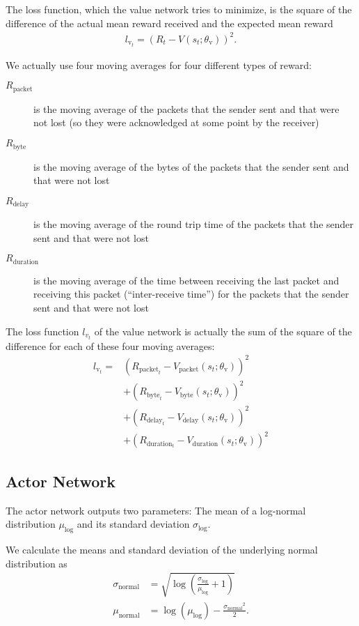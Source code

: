 \documentclass[sigconf]{acmart}
\begin{document}
The loss function, which the value network tries to minimize, is the square of the difference of the actual mean reward received and the expected mean reward
\begin{align*}
l_{\text{v}_t} = \left(R_t - V(s_t; \theta_\text{v})\right)^2.
\end{align*}

We actually use four moving averages for four different types of reward: 
\begin{description}
\item[$\textit{R}_\text{packet}$] is the moving average of the packets that the sender sent and that were not lost (so they were acknowledged at some point by the receiver)
\item[$\textit{R}_\text{byte}$] is the moving average of the bytes of the packets that the sender sent and that were not lost
\item[$\textit{R}_\text{delay}$] is the moving average of the round trip time of the packets that the sender sent and that were not lost
\item[$\textit{R}_\text{duration}$] is the moving average of the time between receiving the last packet and receiving this packet (``inter-receive time'') for the packets that the sender sent and that were not lost
\end{description}

The loss function $l_{v_t}$ of the value network is actually the sum of the square of the difference for each of these four moving averages:
\begin{align*}
l_{\text{v}_t} =& \left(R_{\text{packet}_t} - V_\text{packet}(s_t; \theta_\text{v})\right)^2 \\
&+\left(R_{\text{byte}_t} - V_\text{byte}(s_t; \theta_\text{v})\right)^2 \\
&+\left(R_{\text{delay}_t} - V_\text{delay}(s_t; \theta_\text{v})\right)^2 \\
&+\left(R_{\text{duration}_t} - V_\text{duration}(s_t; \theta_\text{v})\right)^2
\end{align*}

\subsection{Actor Network}
\label{subsec:actor}

The actor network outputs two parameters: The mean of a log-normal distribution $\mu_\text{log}$ and its standard deviation $\sigma_\text{log}$. 

We calculate the means and standard deviation of the underlying normal distribution as
\begin{align*}
\sigma_\text{normal} &= \sqrt{\log \left( \frac{\sigma_\text{log}}{\mu_\text{log}} +1 \right)} \\
\mu_\text{normal} &= \log\left(\mu_\text{log}\right) - \frac{{\sigma_\text{normal}}^2}{2}.
\end{align*}
\end{document}
